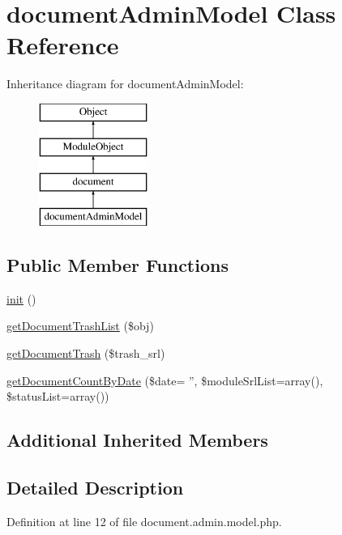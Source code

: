 \hypertarget{classdocumentAdminModel}{\section{document\+Admin\+Model Class Reference}
\label{classdocumentAdminModel}
}
Inheritance diagram for document\+Admin\+Model\+:\begin{figure}[H]
\begin{center}
\leavevmode
\includegraphics[height=4.000000cm]{classdocumentAdminModel}
\end{center}
\end{figure}
\subsection*{Public Member Functions}
\begin{DoxyCompactItemize}
\item 
\hyperlink{classdocumentAdminModel_aa2d2c19a8a236499b03c085bbf578c11}{init} ()
\item 
\hyperlink{classdocumentAdminModel_a2dde1d3304ebc18a52a841aee71b4fad}{get\+Document\+Trash\+List} (\$obj)
\item 
\hyperlink{classdocumentAdminModel_a4cff1ba3f56281a915059ecdbcdfd740}{get\+Document\+Trash} (\$trash\+\_\+srl)
\item 
\hyperlink{classdocumentAdminModel_af678afbc6a4c06e1913f30755a370ab0}{get\+Document\+Count\+By\+Date} (\$date= '', \$module\+Srl\+List=array(), \$status\+List=array())
\end{DoxyCompactItemize}
\subsection*{Additional Inherited Members}


\subsection{Detailed Description}


Definition at line 12 of file document.\+admin.\+model.\+php.



